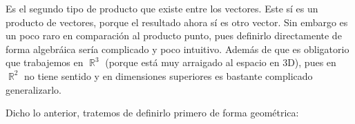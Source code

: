 \documentclass[12pt, fleqn]{report}                             %
\newcommand \Quote {\qq}                                        %
\DeclareMathOperator \Reals        {\mathbb{R}}                 %
\begin{document}
            	Es el segundo tipo de producto que existe entre los vectores. Este sí es un producto \Quote{genuino} de vectores, porque el resultado ahora sí es otro vector. Sin embargo es un poco raro en comparación al producto punto, pues definirlo directamente de forma algebráica sería complicado y poco intuitivo. Además de que es obligatorio que trabajemos en $\Reals^3$ (porque está muy arraigado al espacio en 3D), pues en $\Reals^2$ no tiene sentido y en dimensiones superiores es bastante complicado generalizarlo.
            	
            	Dicho lo anterior, tratemos de definirlo primero de forma geométrica:
            	
            	
\end{document}
